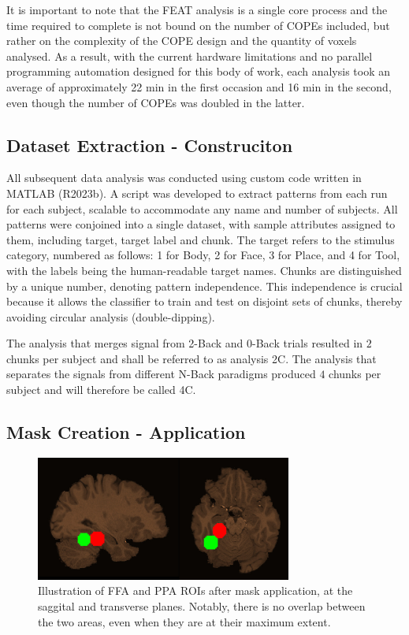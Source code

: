 It is important to note that the \acrshort{FEAT} analysis is a single core process and the time required to complete is not bound on the number of \gls{COPE}s included, but rather on the complexity of the \gls{COPE} design and the quantity of voxels analysed. As a result, with the current hardware limitations and no parallel programming automation designed for this body of work, each analysis took an average of approximately 22 \si{\minute} in the first occasion and 16 \si{\minute} in the second, even though the number of \gls{COPE}s was doubled in the latter.

\subsection{Dataset Extraction - Construciton}

All subsequent data analysis was conducted using custom code written in MATLAB (R2023b). A script was developed to extract patterns from each run for each subject, scalable to accommodate any name and number of subjects. All patterns were conjoined into a single dataset, with sample attributes assigned to them, including target, target label and chunk. The target refers to the stimulus category, numbered as follows: 1 for Body, 2 for Face, 3 for Place, and 4 for Tool, with the labels being the human-readable target names. Chunks are distinguished by a unique number, denoting pattern independence. This independence is crucial because it allows the classifier to train and test on disjoint sets of chunks, thereby avoiding circular analysis (double-dipping).

The analysis that merges signal from 2-Back and 0-Back trials resulted in $2$ chunks per subject and shall be referred to as analysis \gls{2C}. The analysis that separates the signals from different N-Back paradigms produced $4$ chunks per subject and will therefore be called \gls{4C}.

\subsection{Mask Creation - Application}

\begin{figure}[htbp]
    \centering
    \includegraphics[width = 0.75\textwidth]{assets/images/masks_sag_trans.jpg}
    \caption[Illustration of FFA and PPA masks]{Illustration of \gls{FFA} and \gls{PPA} \gls{ROI}s after mask application, at the saggital and transverse planes. Notably, there is no overlap between the two areas, even when they are at their maximum extent.}
    \label{fig:radius}
\end{figure}

